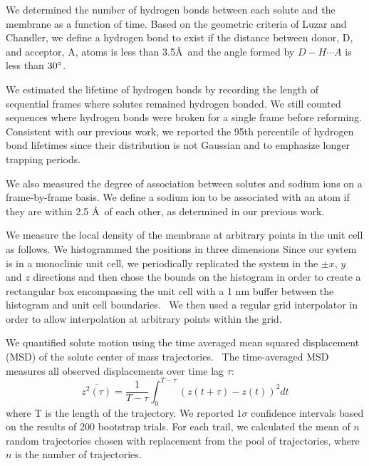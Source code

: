 \documentclass[journal=jpcbfk,manuscript=article]{achemso}
\begin{document}
  We determined the number of hydrogen bonds between each solute and the membrane
  as a function of time. Based on the geometric criteria of Luzar and Chandler, we 
  define a hydrogen bond to exist if the distance between donor, D, and acceptor, 
  A, atoms is less than 3.5\AA~and the angle formed by $D-H \cdots A$ is less than 
  $30\degree$.~\cite{luzar_effect_1996}
  
  We estimated the lifetime of hydrogen bonds by recording the length of 
  sequential frames where solutes remained hydrogen bonded. We still counted sequences
  where hydrogen bonds were broken for a single frame before reforming. Consistent
  with our previous work, we reported the 95th percentile of hydrogen bond lifetimes
  since their distribution is not Gaussian and to emphasize longer trapping periods.~\cite{coscia_chemically_2019}
  
  We also measured the degree of association between solutes and sodium ions on a
  frame-by-frame basis. We define a sodium ion to be associated with an atom if they
  are within 2.5 \AA~of each other, as determined in our previous work.~\cite{coscia_chemically_2019}
  
  We measure the local density of the membrane at arbitrary
  points in the unit cell as follows. We histogrammed the positions in three dimensions
  Since our system is in a monoclinic unit cell, we periodically replicated
  the system in the $\pm x$, $y$ and $z$ directions and then chose the bounds on the
  histogram in order to create a rectangular box encompassing the unit cell with
  a 1 nm buffer between the histogram and unit cell boundaries.~\cite{van_der_walt_numpy_2011} We then used a regular
  grid interpolator in order to allow interpolation at arbitrary points within the grid.~\cite{virtanen_scipy_2020} 
  
  We quantified solute motion using the time averaged mean squared displacement (MSD)
  of the solute center of mass trajectories.~\cite{meroz_toolbox_2015} The time-averaged MSD measures all observed
  displacements over time lag $\tau$:
  \begin{equation}
  	\overline{z^2(\tau)} = \dfrac{1}{T - \tau}\int_{0}^{T - \tau} (z(t + \tau) - z(t))^2 dt
  \label{eqn:tamsd}
  \end{equation}
  where T is the length of the trajectory. We reported $1 \sigma$ confidence intervals 
  based on the results of 200 bootstrap trials. For each trail, we calculated the mean of 
  $n$ random trajectories chosen with replacement from the pool of trajectories, where 
  $n$ is the number of trajectories.
\end{document}
